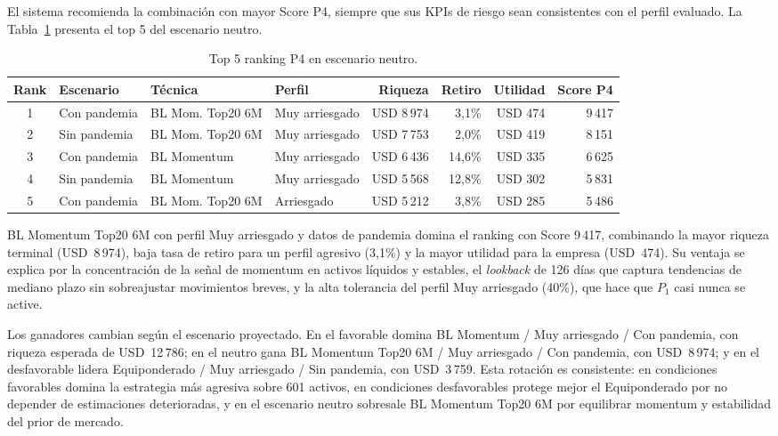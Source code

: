 El sistema recomienda la combinaci\'on con mayor Score P4, siempre que sus KPIs de riesgo sean consistentes con el perfil evaluado. La Tabla~\ref{tab:p4_ranking} presenta el top 5 del escenario neutro.

\begin{table}[h]
\centering
\caption{Top 5 ranking P4 en escenario neutro.}
\label{tab:p4_ranking}
\scriptsize
\begin{tabular}{@{}clllrrrr@{}}
\toprule
Rank & Escenario & T\'ecnica & Perfil & Riqueza & Retiro & Utilidad &
Score P4 \\
\midrule
1 & Con pandemia & BL Mom. Top20 6M & Muy arriesgado & USD 8\,974 & 3,1\% &
USD 474 & 9\,417 \\
2 & Sin pandemia & BL Mom. Top20 6M & Muy arriesgado & USD 7\,753 & 2,0\% &
USD 419 & 8\,151 \\
3 & Con pandemia & BL Momentum & Muy arriesgado & USD 6\,436 & 14,6\% &
USD 335 & 6\,625 \\
4 & Sin pandemia & BL Momentum & Muy arriesgado & USD 5\,568 & 12,8\% &
USD 302 & 5\,831 \\
5 & Con pandemia & BL Mom. Top20 6M & Arriesgado & USD 5\,212 & 3,8\% &
USD 285 & 5\,486 \\
\bottomrule
\end{tabular}
\end{table}

BL Momentum Top20 6M con perfil Muy arriesgado y datos de pandemia domina el ranking con Score 9\,417, combinando la mayor riqueza terminal (USD~8\,974), baja tasa de retiro para un perfil agresivo (3,1\%) y la mayor utilidad para la empresa (USD~474). Su ventaja se explica por la concentraci\'on de la se\~nal de momentum en activos l\'iquidos y estables, el \textit{lookback} de 126 d\'ias que captura tendencias de mediano plazo sin sobreajustar movimientos breves, y la alta tolerancia del perfil Muy arriesgado (40\%), que hace que $P_1$ casi nunca se active.

Los ganadores cambian seg\'un el escenario proyectado. En el favorable domina BL Momentum / Muy arriesgado / Con pandemia, con riqueza esperada de USD~12\,786; en el neutro gana BL Momentum Top20 6M / Muy arriesgado / Con pandemia, con USD~8\,974; y en el desfavorable lidera Equiponderado / Muy arriesgado / Sin pandemia, con USD~3\,759. Esta rotaci\'on es consistente: en condiciones favorables domina la estrategia m\'as agresiva sobre 601 activos, en condiciones desfavorables protege mejor el Equiponderado por no depender de estimaciones deterioradas, y en el escenario neutro sobresale BL Momentum Top20 6M por equilibrar momentum y estabilidad del prior de mercado.

